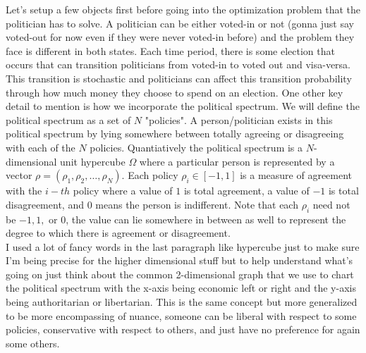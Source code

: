 \documentclass[11pt,english]{article}
\begin{document}
Let's setup a few objects first before going into the optimization problem that the politician has to solve. A politician can be either voted-in or not (gonna just say voted-out for now even if they were never voted-in before) and the problem they face is different in both states. Each time period, there is some election that occurs that can transition politicians from voted-in to voted out and visa-versa. This transition is stochastic and politicians can affect this transition probability through how much money they choose to spend on an election. One other key detail to mention is how we incorporate the political spectrum. We will define the political spectrum as a set of $N$ "policies". A person/politician exists in this political spectrum by lying somewhere between totally agreeing or disagreeing with each of the $N$ policies. Quantiatively the political spectrum is a $N$-dimensional unit hypercube $\Omega$ where a particular person is represented by a vector $\rho = (\rho_1, \rho_2, \ldots, \rho_N)$. Each policy $\rho_i \in [-1,1]$ is a measure of agreement with the $i-th$ policy where a value of $1$ is total agreement, a value of $-1$ is total disagreement, and $0$ means the person is indifferent. Note that each $\rho_i$ need not be $-1,1,$ or $0$, the value can lie somewhere in between as well to represent the degree to which there is agreement or disagreement.\\

\noindent I used a lot of fancy words in the last paragraph like hypercube just to make sure I'm being precise for the higher dimensional stuff but to help understand what's going on just think about the common 2-dimensional graph that we use to chart the political spectrum with the x-axis being economic left or right and the y-axis being authoritarian or libertarian. This is the same concept but more generalized to be more encompassing of nuance, someone can be liberal with respect to some policies, conservative with respect to others, and just have no preference for again some others.\\
\end{document}
